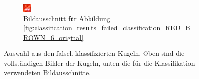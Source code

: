\begin{figure}[h]
\begin{subfigure}[t]{0.2\textwidth}
                \includegraphics[width=1.0\linewidth]{../common/04_results/resources/classification/failed_classification_RED_BROWN_6_roi.png}
                \caption{Bildausschnitt für Abbildung \ref{fig:classification_results_failed_classification_RED_BROWN_6_original}}
                \label{fig:classification_results_failed_classification_RED_BROWN_6_roi}
        \end{subfigure}
        \caption{
                Auswahl aus den falsch klassifizierten Kugeln.
                Oben sind die vollständigen Bilder der Kugeln, unten die für die Klassifikation verwendeten Bildausschnitte.
        }
        \label{fig:classification_results_failed_examples}
\end{figure}

